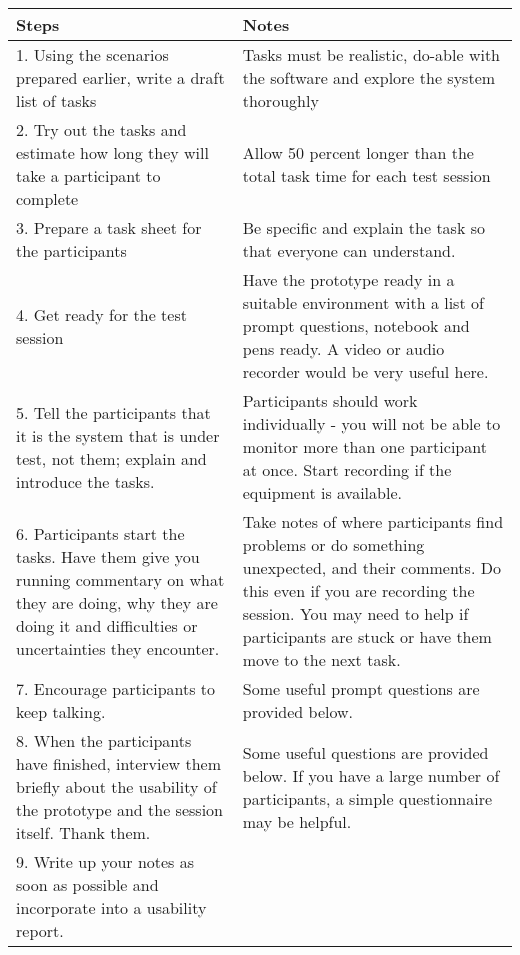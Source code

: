 \begin{longtable}{ | p{4.7cm} | p{5.1cm} |}
  \hline
  Steps & Notes \\ \hline
  1. Using the scenarios prepared earlier, write a draft list of tasks & Tasks must be realistic, do-able with the software and explore the system thoroughly \\ \hline
	2. Try out the tasks and estimate how long they will take a participant to complete & Allow 50 percent longer than the total task time for each test session \\ \hline
	3. Prepare a task sheet for the participants & Be specific and explain the task so that everyone can understand. \\ \hline
	4. Get ready for the test session & Have the prototype ready in a suitable environment with a list of prompt questions, notebook and pens ready. A video or audio recorder would be very useful here. \\ \hline
	5. Tell the participants that it is the system that is under test, not them; explain and introduce the tasks. & Participants should work individually - you will not be able to monitor more than one participant at once. Start recording if the equipment is available. \\ \hline
	6. Participants start the tasks. Have them give you running commentary on what they are doing, why they are doing it and difficulties or uncertainties they encounter. & Take notes of where participants find problems or do something unexpected, and their comments. Do this even if you are recording the session. You may need to help if participants are stuck or have them move to the next task. \\ \hline
	7. Encourage participants to keep talking. & Some useful prompt questions are provided below. \\ \hline
	8. When the participants have finished, interview them briefly about the usability of the prototype and the session itself. Thank them. & Some useful questions are provided below. If you have a large number of participants, a simple questionnaire may be helpful. \\ \hline
	9. Write up your notes as soon as possible and incorporate into a usability report. & \\ \hline
\end{longtable}